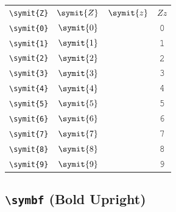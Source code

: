 \documentclass[12pt,a4paper]{article}
\begin{document}
\begin{longtable}{|c|c|c|c|}
\verb|\symit{Z}| & $\symit{Z}$ & $\symit{z}$ & $ 𝑍 𝑧 $ \\
\verb|\symit{0}| & $\symit{0}$ & & 𝟶 \\
\verb|\symit{1}| & $\symit{1}$ & & 𝟷 \\
\verb|\symit{2}| & $\symit{2}$ & & 𝟸 \\
\verb|\symit{3}| & $\symit{3}$ & & 𝟹 \\
\verb|\symit{4}| & $\symit{4}$ & & 𝟺 \\
\verb|\symit{5}| & $\symit{5}$ & & 𝟻 \\
\verb|\symit{6}| & $\symit{6}$ & & 𝟼 \\
\verb|\symit{7}| & $\symit{7}$ & & 𝟽 \\
\verb|\symit{8}| & $\symit{8}$ & & 𝟾 \\
\verb|\symit{9}| & $\symit{9}$ & & 𝟿 \\
\hline
\end{longtable}

\newpage

\subsection*{\texttt{\textbackslash{}symbf} (Bold Upright)}
\end{document}
